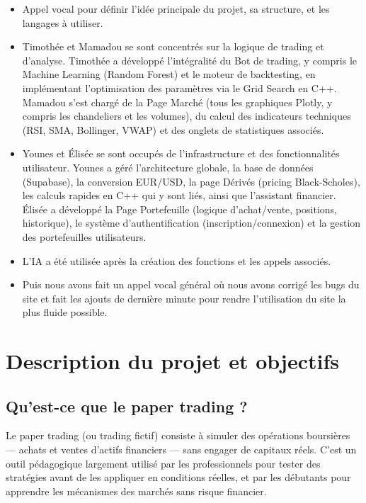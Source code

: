 \documentclass[a4paper, 12pt, twoside]{article}
\begin{document}
\begin{itemize}
    \item Appel vocal pour définir l'idée principale du projet, sa
          structure, et les langages à utiliser.
    \item Timothée et Mamadou se sont concentrés sur la logique de
          trading et d'analyse. Timothée a développé l'intégralité du
          Bot de trading, y compris le Machine Learning (Random Forest)
          et le moteur de backtesting, en implémentant l'optimisation
          des paramètres via le Grid Search en C++. Mamadou s'est chargé
          de la Page Marché (tous les graphiques Plotly, y compris les
          chandeliers et les volumes), du calcul des indicateurs
          techniques (RSI, SMA, Bollinger, VWAP) et des onglets de
          statistiques associés.
    \item Younes et Élisée se sont occupés de l'infrastructure et des
          fonctionnalités utilisateur. Younes a géré l'architecture
          globale, la base de données (Supabase), la conversion EUR/USD,
          la page Dérivés (pricing Black-Scholes), les calculs rapides
          en C++ qui y sont liés, ainsi que l'assistant financier.
          Élisée a développé la Page Portefeuille (logique d'achat/vente,
          positions, historique), le système d'authentification
          (inscription/connexion) et la gestion des portefeuilles
          utilisateurs.
    \item L'IA a été utilisée après la création des fonctions et les
          appels associés.
    \item Puis nous avons fait un appel vocal général où nous avons
          corrigé les bugs du site et fait les ajouts de dernière minute
          pour rendre l'utilisation du site la plus fluide possible.
\end{itemize}

\section{Description du projet et objectifs}

\subsection{Qu'est-ce que le paper trading ?}

Le paper trading (ou trading fictif) consiste à simuler des opérations
boursières --- achats et ventes d'actifs financiers --- sans engager de
capitaux réels. C'est un outil pédagogique largement utilisé par les
professionnels pour tester des stratégies avant de les appliquer en
conditions réelles, et par les débutants pour apprendre les mécanismes
des marchés sans risque financier.
\end{document}
